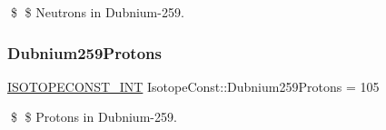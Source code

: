 \$ \$ Neutrons in Dubnium-\/259. \mbox{\label{group___isotope_const-_dubnium-_db259_gaf6ebb88b5bdf7c44fc3b3aae1cd81d66}} 
\subsubsection{\texorpdfstring{Dubnium259\+Protons}{Dubnium259Protons}}
{\footnotesize\ttfamily \mbox{\hyperlink{group___isotope_const-_macros_ga5f18360b3e99483a35c32d789e62621c}{I\+S\+O\+T\+O\+P\+E\+C\+O\+N\+S\+T\+\_\+\+I\+NT}} Isotope\+Const\+::\+Dubnium259\+Protons = 105}

\$ \$ Protons in Dubnium-\/259. 